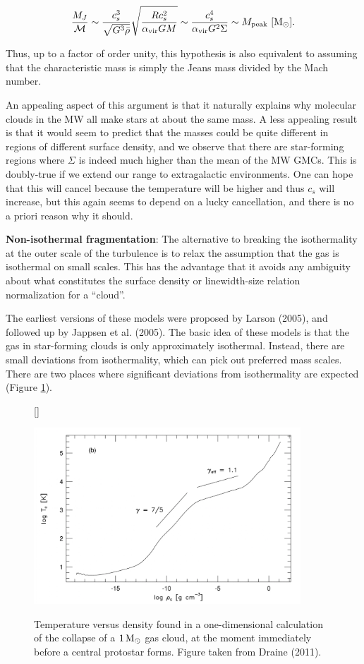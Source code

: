 \documentclass[a4paper,10pt]{article}
\begin{document}
\begin{align*}
    \frac{M_J}{\mathcal{M}} \sim \frac{c_s^3}{\sqrt{G^3\bar{\rho}}} \sqrt{\frac{Rc_s^2}{\alpha_\mathrm{vir}GM}} \sim \frac{c_s^4}{\alpha_\mathrm{vir}G^2\Sigma} \sim M_\mathrm{peak} ~ [{\rm M_\odot}].
\end{align*}

{\noindent}Thus, up to a factor of order unity, this hypothesis is also equivalent to assuming that the characteristic mass is simply the Jeans mass divided by the Mach number.

{\noindent}An appealing aspect of this argument is that it naturally explains why molecular clouds in the MW all make stars at about the same mass. A less appealing result is that it would seem to predict that the masses could be quite different in regions of different surface density, and we observe that there are star-forming regions where $\Sigma$ is indeed much higher than the mean of the MW GMCs. This is doubly-true if we extend our range to extragalactic environments. One can hope that this will cancel because the temperature will be higher and thus $c_s$ will increase, but this again seems to depend on a lucky cancellation, and there is no a priori reason why it should.

{\noindent}\textbf{Non-isothermal fragmentation}: The alternative to breaking the isothermality at the outer scale of the turbulence is to relax the assumption that the gas is isothermal on small scales. This has the advantage that it avoids any ambiguity about what constitutes the surface density or linewidth-size relation normalization for a ``cloud''.

{\noindent}The earliest versions of these models were proposed by Larson (2005), and followed up by Jappsen et al. (2005). The basic idea of these models is that the gas in star-forming clouds is only approximately isothermal. Instead, there are small deviations from isothermality, which can pick out preferred mass scales. There are two places where significant deviations from isothermality are expected (Figure \ref{fig:sf_tvsrho}).

\begin{figure}[t]
    [\FBwidth]
    {\caption{\footnotesize{Temperature versus density found in a one-dimensional calculation of the collapse of a $1\,{\rm M_\odot}$ gas cloud, at the moment immediately before a central protostar forms. Figure taken from Draine (2011).}}
    \label{fig:sf_tvsrho}}
    {\includegraphics[width=10cm]{figures/SF_TvsRho.png}}
\end{figure}
\end{document}
